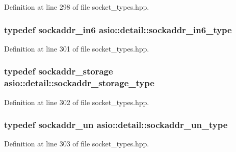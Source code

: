 Definition at line 298 of file socket\+\_\+types.\+hpp.

\hypertarget{namespaceasio_1_1detail_a57768e6ae10076201e58c76fe4e8495d}{}
\subsubsection[{sockaddr\+\_\+in6\+\_\+type}]{\setlength{\rightskip}{0pt plus 5cm}typedef sockaddr\+\_\+in6 {\bf asio\+::detail\+::sockaddr\+\_\+in6\+\_\+type}}\label{namespaceasio_1_1detail_a57768e6ae10076201e58c76fe4e8495d}


Definition at line 301 of file socket\+\_\+types.\+hpp.

\hypertarget{namespaceasio_1_1detail_a5b5da7704fe08eec4df1fb52b6d1bf98}{}
\subsubsection[{sockaddr\+\_\+storage\+\_\+type}]{\setlength{\rightskip}{0pt plus 5cm}typedef sockaddr\+\_\+storage {\bf asio\+::detail\+::sockaddr\+\_\+storage\+\_\+type}}\label{namespaceasio_1_1detail_a5b5da7704fe08eec4df1fb52b6d1bf98}


Definition at line 302 of file socket\+\_\+types.\+hpp.

\hypertarget{namespaceasio_1_1detail_ab1311931a71e98cfaf6b81fe317e534d}{}
\subsubsection[{sockaddr\+\_\+un\+\_\+type}]{\setlength{\rightskip}{0pt plus 5cm}typedef sockaddr\+\_\+un {\bf asio\+::detail\+::sockaddr\+\_\+un\+\_\+type}}\label{namespaceasio_1_1detail_ab1311931a71e98cfaf6b81fe317e534d}


Definition at line 303 of file socket\+\_\+types.\+hpp.

\hypertarget{namespaceasio_1_1detail_a40a7b0385a38f87815ffbb8df5e34d05}{}
